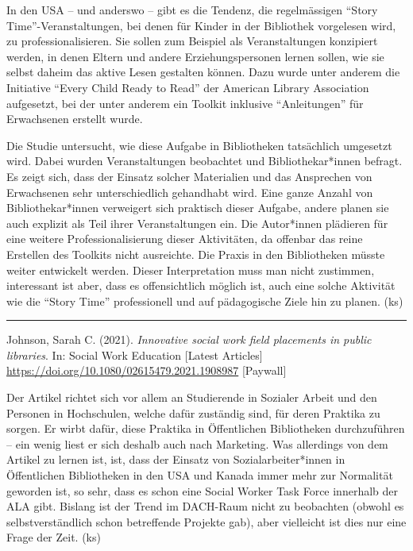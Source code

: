\documentclass[a4paper,
fontsize=11pt,
oneside,
numbers=noperiodatend,
parskip=half-,
bibliography=totoc,
final
]{scrartcl}
\begin{document}
In den USA -- und anderswo -- gibt es die Tendenz, die regelmässigen
\enquote{Story Time}-Veranstaltungen, bei denen für Kinder in der
Bibliothek vorgelesen wird, zu professionalisieren. Sie sollen zum
Beispiel als Veranstaltungen konzipiert werden, in denen Eltern und
andere Erziehungspersonen lernen sollen, wie sie selbst daheim das
aktive Lesen gestalten können. Dazu wurde unter anderem die Initiative
\enquote{Every Child Ready to Read} der American Library Association
aufgesetzt, bei der unter anderem ein Toolkit inklusive
\enquote{Anleitungen} für Erwachsenen erstellt wurde.

Die Studie untersucht, wie diese Aufgabe in Bibliotheken tatsächlich
umgesetzt wird. Dabei wurden Veranstaltungen beobachtet und
Bibliothekar*innen befragt. Es zeigt sich, dass der Einsatz solcher
Materialien und das Ansprechen von Erwachsenen sehr unterschiedlich
gehandhabt wird. Eine ganze Anzahl von Bibliothekar*innen verweigert
sich praktisch dieser Aufgabe, andere planen sie auch explizit als Teil
ihrer Veranstaltungen ein. Die Autor*innen plädieren für eine weitere
Professionalisierung dieser Aktivitäten, da offenbar das reine Erstellen
des Toolkits nicht ausreichte. Die Praxis in den Bibliotheken müsste
weiter entwickelt werden. Dieser Interpretation muss man nicht
zustimmen, interessant ist aber, dass es offensichtlich möglich ist,
auch eine solche Aktivität wie die \enquote{Story Time} professionell
und auf pädagogische Ziele hin zu planen. (ks)

\begin{center}\rule{0.5\linewidth}{0.5pt}\end{center}

Johnson, Sarah C. (2021). \emph{Innovative social work field placements
in public libraries}. In: Social Work Education {[}Latest Articles{]}
\url{https://doi.org/10.1080/02615479.2021.1908987} {[}Paywall{]}

Der Artikel richtet sich vor allem an Studierende in Sozialer Arbeit und
den Personen in Hochschulen, welche dafür zuständig sind, für deren
Praktika zu sorgen. Er wirbt dafür, diese Praktika in Öffentlichen
Bibliotheken durchzuführen -- ein wenig liest er sich deshalb auch nach
Marketing. Was allerdings von dem Artikel zu lernen ist, ist, dass der
Einsatz von Sozialarbeiter*innen in Öffentlichen Bibliotheken in den USA
und Kanada immer mehr zur Normalität geworden ist, so sehr, dass es
schon eine Social Worker Task Force innerhalb der ALA gibt. Bislang ist
der Trend im DACH-Raum nicht zu beobachten (obwohl es selbstverständlich
schon betreffende Projekte gab), aber vielleicht ist dies nur eine Frage
der Zeit. (ks)
\end{document}
